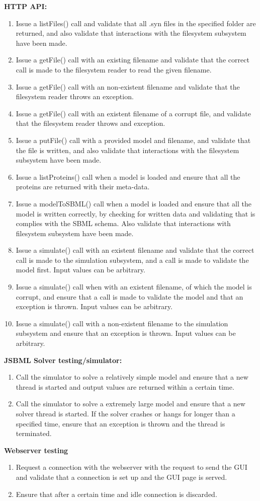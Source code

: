 \noindent \textbf{HTTP API:
}\begin{enumerate}
\item Issue a listFiles() call and validate that all .syn files in the specified folder are returned, and also validate that interactions with the filesystem subsystem have been made.\item Issue a getFile() call with an existing filename and validate that the correct call is made to the filesystem reader to read the given filename.
\item Issue a getFile() call with an non-existent filename and validate that the filesystem reader throws an exception.
\item Issue a getFile() call with an existent filename of a corrupt file, and validate that the filesystem reader throws and exception.
\item Issue a putFile() call with a provided model and filename, and validate that the file is written,  and also validate that interactions with the filesystem subsystem have been made.\item Issue a listProteins() call when a model is loaded and ensure that all the proteins are returned with their meta-data.
\item Issue a modelToSBML() call when a model is loaded and ensure that all the model is written correctly, by checking for written data and validating that is complies with the SBML schema. Also validate that interactions with filesystem subsystem have been made.
\item Issue a simulate() call with an existent filename and validate that the correct call is made to the simulation subsystem, and a call is made to validate the model first. Input values can be arbitrary.
\item Issue a simulate() call when with an existent filename, of which the model is corrupt, and ensure that a call is made to validate the model and that an exception is thrown. Input values can be arbitrary.\item  Issue a simulate() call with a non-existent filename  to the simulation subsystem and ensure that an exception is thrown. Input values can be arbitrary.\end{enumerate}
\textbf{JSBML Solver testing/simulator:}
\begin{enumerate}
\item 
Call the simulator  to solve a relatively simple model and ensure that a new thread is started and output values are returned within a certain time.
\item Call the simulator to solve a extremely large model and ensure that a new solver thread is started. If the solver crashes or hangs for longer than a specified time, ensure that an exception is thrown and the thread is terminated.
\end{enumerate}
\textbf{Webserver testing}
\begin{enumerate}
\item Request a connection with the webserver with the request to send the GUI and validate that a connection is set up and the GUI page is  served. 
\item Ensure that after a certain time and idle connection is discarded.
\end{enumerate}

